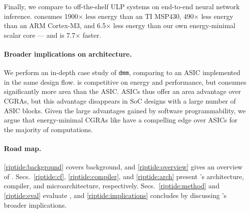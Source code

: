 Finally, we compare \riptide to off-the-shelf ULP systems on end-to-end neural network inference.
\riptide consumes 1900$\times$ less energy than an TI MSP430,
490$\times$ less energy than an ARM Cortex-M3,
and 6.5$\times$ less energy than our own energy-minimal scalar core
--- and \riptide is 7.7$\times$ faster.

\paragraph{Broader implications on architecture.}

We perform an in-depth case study of {\tt dmm},
comparing \riptide to an ASIC implemented in the same
design flow. \riptide is competitive on energy and performance, but
consumes significantly more area than the ASIC.
%
ASICs thus offer an area advantage over CGRAs, but this advantage
disappears in SoC designs with a large number of ASIC blocks. Given
the large advantages gained by software programmability, we argue that
energy-minimal CGRAs like \riptide have a compelling edge over ASICs for
the majority of computations.

\paragraph{Road map.}
%
\autoref{riptide:background} covers background, and
\autoref{riptide:overview} gives an overview of \riptide.
%
Secs.~\autoref{riptide:cf}, \autoref{riptide:compiler}, and \ref{riptide:arch} present
\riptide's architecture, compiler, and microarchitecture, respectively.
%
Secs.~\autoref{riptide:method} and \autoref{riptide:eval} evaluate \riptide, and
\autoref{riptide:implications} concludes by discussing \riptide's broader implications.

